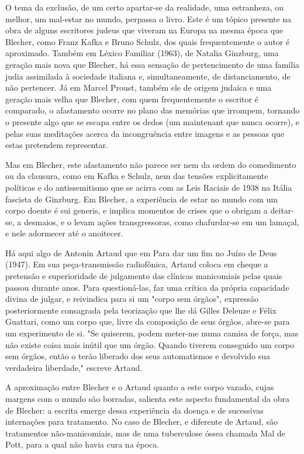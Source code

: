 O tema da exclusão, de um certo apartar-se da realidade, uma estranheza, ou melhor, um mal-estar no mundo, perpassa o livro. Este é um tópico presente na obra de alguns escritores judeus que viveram na Europa na mesma época que Blecher, como Franz Kafka e Bruno Schulz, dos quais frequentemente o autor é aproximado. Também em Léxico Familiar (1963), de Natalia Ginzburg, uma geração mais nova que Blecher, há essa sensação de pertencimento de uma família judia assimilada à sociedade italiana e, simultaneamente, de distanciamento, de não pertencer. Já em Marcel Proust, também ele de origem judaica e uma geração mais velha que Blecher, com quem frequentemente o escritor é comparado, o afastamento ocorre no plano das memórias que irrompem, tornando o presente algo que se escapa entre os dedos (um maintenant que nunca ocorre), e pelas suas meditações acerca da incongruência entre imagens e as pessoas que estas pretendem representar.

Mas em Blecher, este afastamento não parece ser nem da ordem do comedimento ou da clausura, como em Kafka e Schulz, nem das tensões explicitamente políticas e do antissemitismo que se acirra com as Leis Raciais de 1938 na Itália fascista de Ginzburg. Em Blecher, a experiência de estar no mundo com um corpo doente é sui generis, e implica momentos de crises que o obrigam a deitar-se, a desmaios, e o levam ações transgressoras, como chafurdar-se em um lamaçal, e nele adormecer até o anoitecer.

Há aqui algo de Antonin Artaud que em Para dar um fim no Juízo de Deus (1947). Em sua peça-transmissão radiofônica, Artaud coloca em cheque a pretensão e superioridade de julgamento das clínicas manicomiais pelas quais passou durante anos. Para questioná-las, faz uma crítica da própria capacidade divina de julgar, e reivindica para si um "corpo sem órgãos", expressão posteriormente consagrada pela teorização que lhe dá Gilles Deleuze e Félix Guattari, como um corpo que, livre da composição de seus órgãos, abre-se para um experimento de si. "Se quiserem, podem meter-me numa camisa de força, mas não existe coisa mais inútil que um órgão. Quando tiverem conseguido um corpo sem órgãos, então o terão liberado dos seus automatismos e devolvido sua verdadeira liberdade," escreve Artaud.

A aproximação entre Blecher e o Artaud quanto a este corpo vazado, cujas margens com o mundo são borradas, salienta este aspecto fundamental da obra de Blecher: a escrita emerge dessa experiência da doença e de sucessivas internações para tratamento. No caso de Blecher, e diferente de Artaud, são tratamentos não-manicomiais, mas de uma tuberculose óssea chamada Mal de Pott, para a qual não havia cura na época.

